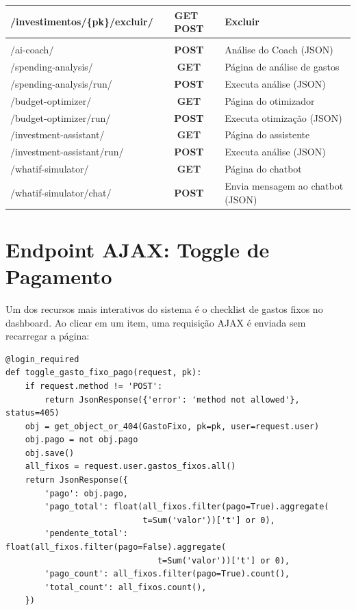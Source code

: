\documentclass[12pt, a4paper, oneside]{report}
\newcommand{\badge}[2]{%
  \colorbox{#1!15!white}{\textcolor{#1}{\textbf{\small #2}}}%
}
\newcommand{\httpget}{\badge{success}{GET}}
\newcommand{\httppost}{\badge{primary}{POST}}
\begin{document}
\begin{table}[H]
\begin{tabularx}{\textwidth}{>{\ttfamily\small}l c X}
/investimentos/\{pk\}/excluir/ & \httpget\,\httppost & Excluir \\
\midrule
\multicolumn{3}{l}{\textbf{Módulos de IA}} \\
/ai-coach/ & \httppost & Análise do Coach (JSON) \\
/spending-analysis/ & \httpget & Página de análise de gastos \\
/spending-analysis/run/ & \httppost & Executa análise (JSON) \\
/budget-optimizer/ & \httpget & Página do otimizador \\
/budget-optimizer/run/ & \httppost & Executa otimização (JSON) \\
/investment-assistant/ & \httpget & Página do assistente \\
/investment-assistant/run/ & \httppost & Executa análise (JSON) \\
/whatif-simulator/ & \httpget & Página do chatbot \\
/whatif-simulator/chat/ & \httppost & Envia mensagem ao chatbot (JSON) \\
\bottomrule
\end{tabularx}
\end{table}

\section{Endpoint AJAX: Toggle de Pagamento}

Um dos recursos mais interativos do sistema é o checklist de gastos fixos no dashboard. Ao clicar em um item, uma requisição AJAX é enviada sem recarregar a página:

\begin{lstlisting}[style=django, caption={View de toggle de pagamento}]
@login_required
def toggle_gasto_fixo_pago(request, pk):
    if request.method != 'POST':
        return JsonResponse({'error': 'method not allowed'}, status=405)
    obj = get_object_or_404(GastoFixo, pk=pk, user=request.user)
    obj.pago = not obj.pago
    obj.save()
    all_fixos = request.user.gastos_fixos.all()
    return JsonResponse({
        'pago': obj.pago,
        'pago_total': float(all_fixos.filter(pago=True).aggregate(
                            t=Sum('valor'))['t'] or 0),
        'pendente_total': float(all_fixos.filter(pago=False).aggregate(
                               t=Sum('valor'))['t'] or 0),
        'pago_count': all_fixos.filter(pago=True).count(),
        'total_count': all_fixos.count(),
    })
\end{lstlisting}
\end{document}
